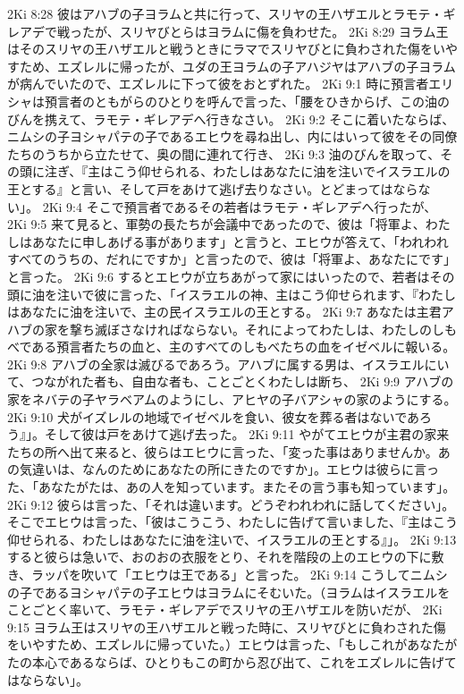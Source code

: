 2Ki 8:28  彼はアハブの子ヨラムと共に行って、スリヤの王ハザエルとラモテ・ギレアデで戦ったが、スリヤびとらはヨラムに傷を負わせた。
2Ki 8:29  ヨラム王はそのスリヤの王ハザエルと戦うときにラマでスリヤびとに負わされた傷をいやすため、エズレルに帰ったが、ユダの王ヨラムの子アハジヤはアハブの子ヨラムが病んでいたので、エズレルに下って彼をおとずれた。
2Ki 9:1  時に預言者エリシャは預言者のともがらのひとりを呼んで言った、「腰をひきからげ、この油のびんを携えて、ラモテ・ギレアデへ行きなさい。
2Ki 9:2  そこに着いたならば、ニムシの子ヨシャパテの子であるエヒウを尋ね出し、内にはいって彼をその同僚たちのうちから立たせて、奥の間に連れて行き、
2Ki 9:3  油のびんを取って、その頭に注ぎ、『主はこう仰せられる、わたしはあなたに油を注いでイスラエルの王とする』と言い、そして戸をあけて逃げ去りなさい。とどまってはならない」。
2Ki 9:4  そこで預言者であるその若者はラモテ・ギレアデへ行ったが、
2Ki 9:5  来て見ると、軍勢の長たちが会議中であったので、彼は「将軍よ、わたしはあなたに申しあげる事があります」と言うと、エヒウが答えて、「われわれすべてのうちの、だれにですか」と言ったので、彼は「将軍よ、あなたにです」と言った。
2Ki 9:6  するとエヒウが立ちあがって家にはいったので、若者はその頭に油を注いで彼に言った、「イスラエルの神、主はこう仰せられます、『わたしはあなたに油を注いで、主の民イスラエルの王とする。
2Ki 9:7  あなたは主君アハブの家を撃ち滅ぼさなければならない。それによってわたしは、わたしのしもべである預言者たちの血と、主のすべてのしもべたちの血をイゼベルに報いる。
2Ki 9:8  アハブの全家は滅びるであろう。アハブに属する男は、イスラエルにいて、つながれた者も、自由な者も、ことごとくわたしは断ち、
2Ki 9:9  アハブの家をネバテの子ヤラベアムのようにし、アヒヤの子バアシャの家のようにする。
2Ki 9:10  犬がイズレルの地域でイゼベルを食い、彼女を葬る者はないであろう』」。そして彼は戸をあけて逃げ去った。
2Ki 9:11  やがてエヒウが主君の家来たちの所へ出て来ると、彼らはエヒウに言った、「変った事はありませんか。あの気違いは、なんのためにあなたの所にきたのですか」。エヒウは彼らに言った、「あなたがたは、あの人を知っています。またその言う事も知っています」。
2Ki 9:12  彼らは言った、「それは違います。どうぞわれわれに話してください」。そこでエヒウは言った、「彼はこうこう、わたしに告げて言いました、『主はこう仰せられる、わたしはあなたに油を注いで、イスラエルの王とする』」。
2Ki 9:13  すると彼らは急いで、おのおの衣服をとり、それを階段の上のエヒウの下に敷き、ラッパを吹いて「エヒウは王である」と言った。
2Ki 9:14  こうしてニムシの子であるヨシャパテの子エヒウはヨラムにそむいた。（ヨラムはイスラエルをことごとく率いて、ラモテ・ギレアデでスリヤの王ハザエルを防いだが、
2Ki 9:15  ヨラム王はスリヤの王ハザエルと戦った時に、スリヤびとに負わされた傷をいやすため、エズレルに帰っていた。）エヒウは言った、「もしこれがあなたがたの本心であるならば、ひとりもこの町から忍び出て、これをエズレルに告げてはならない」。
